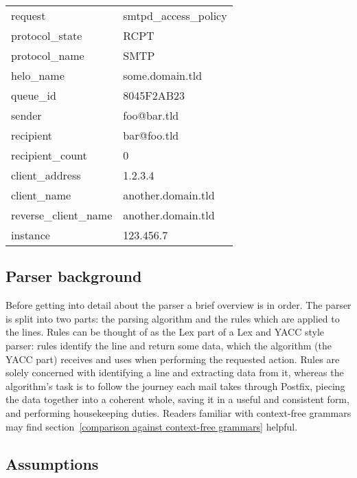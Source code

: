 \documentclass[a4paper,12pt,draft]{article}
\begin{document}
\begin{tabular}[]{ll}

    request                 & smtpd\_access\_policy     \\
    protocol\_state         & RCPT                      \\
    protocol\_name          & SMTP                      \\
    helo\_name              & some.domain.tld           \\
    queue\_id               & 8045F2AB23                \\
    sender                  & foo@bar.tld               \\
    recipient               & bar@foo.tld               \\
    recipient\_count        & 0                         \\
    client\_address         & 1.2.3.4                   \\
    client\_name            & another.domain.tld        \\
    reverse\_client\_name   & another.domain.tld        \\
    instance                & 123.456.7                 \\

\end{tabular}



\subsection{Parser background}

Before getting into detail about the parser a brief overview is in order.
The parser is split into two parts: the parsing algorithm and the rules
which are applied to the lines.  Rules can be thought of as the Lex part of
a Lex and YACC style parser: rules identify the line and return some data,
which the algorithm (the YACC part) receives and uses when performing the
requested action.  Rules are solely concerned with identifying a line and
extracting data from it, whereas the algorithm's task is to follow the
journey each mail takes through Postfix, piecing the data together into a
coherent whole, saving it in a useful and consistent form, and performing
housekeeping duties.  Readers familiar with context-free grammars may find
section~\ref{comparison against context-free grammars} helpful.

\subsection{Assumptions}
\end{document}
